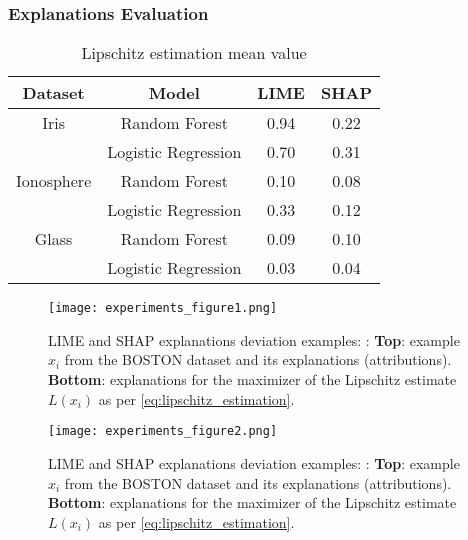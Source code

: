 \documentclass[english]{tktltiki2}
\theoremstyle{definition}
\theoremstyle{remark}
\begin{document}
\subsubsection{Explanations Evaluation}
\begin{table}[H]
	\caption{Lipschitz estimation mean value}
	\label{tab:quantitative_experimentation_iris}
	\begin{center}
		\begin{tabular}{|c|c|c|c|}
			\hline
			\textbf{Dataset} & \textbf{Model} & \textbf{LIME} & \textbf{SHAP} \\ \hline
			
			Iris & Random Forest & 0.94 & 0.22  \\ \hline
				& Logistic Regression & 0.70 & 0.31 \\ \hline

			Ionosphere & Random Forest & 0.10 & 0.08 \\ \hline
				& Logistic Regression & 0.33 & 0.12 \\ \hline
			
			Glass & Random Forest & 0.09 & 0.10 \\ \hline
				& Logistic Regression & 0.03 & 0.04 \\ \hline

		\end{tabular}
	\end{center}
\end{table}

\begin{center}
\begin{figure}[H]
	\texttt{[image: experiments\_figure1.png]}
	\vspace*{-10mm}
	\caption{LIME and SHAP explanations deviation examples: \citep{alvarez2018robustness}: \textbf{Top}: example $x_i$ from the BOSTON dataset and its explanations (attributions). \textbf{Bottom}: explanations for the maximizer of the Lipschitz estimate $L(x_i)$ as per \eqref{eq:lipschitz_estimation}.}
	\label{fig:experiments_figure1}
\end{figure}
\end{center}

\begin{figure}[H]
	\texttt{[image: experiments\_figure2.png]}
	\vspace*{-10mm}
	\caption{LIME and SHAP explanations deviation examples: \citep{alvarez2018robustness}: \textbf{Top}: example $x_i$ from the BOSTON dataset and its explanations (attributions). \textbf{Bottom}: explanations for the maximizer of the Lipschitz estimate $L(x_i)$ as per \eqref{eq:lipschitz_estimation}.}
	\label{fig:experiments_figure2}
\end{figure} 
\end{document}
